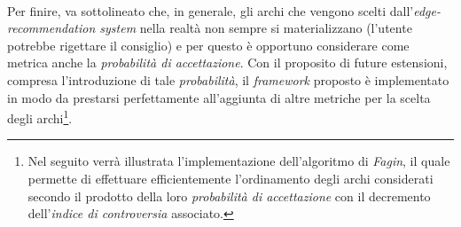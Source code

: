 \documentclass[trieste,12pt]{toptesi}
\makeatletter
\newcommand\listofcodes{%
 \iffrontmatter\else\frontmattertrue\fi
 \if@openright\cleardoublepage\else\clearpage\fi
 \begingroup\def\chapter##1{\@schapter}
 \phantomsection %
 \lstlistoflistings 
 \endgroup
}
\makeatother
\begin{document}
\\Per finire, va sottolineato che, in generale, gli archi che vengono scelti dall'\textit{edge-recommendation system} nella realtà non sempre si materializzano (l'utente potrebbe rigettare il consiglio) e per questo è opportuno considerare come metrica anche la \textit{probabilità di accettazione}. Con il proposito di future estensioni, compresa l'introduzione di tale \textit{probabilità}, il \textit{framework} proposto è implementato in modo da prestarsi perfettamente all'aggiunta di altre metriche per la scelta degli archi\footnote{Nel seguito verrà illustrata l'implementazione dell'algoritmo di \textit{Fagin}, il quale permette di effettuare efficientemente l'ordinamento degli archi considerati secondo il prodotto della loro \textit{probabilità di accettazione} con il decremento dell'\textit{indice di controversia} associato.}.





\tableofcontents

\listoffigures

\listoftables

\listofcodes


\mainmatter








\appendix



\nocite{*}
\printbibliography
\end{document}
